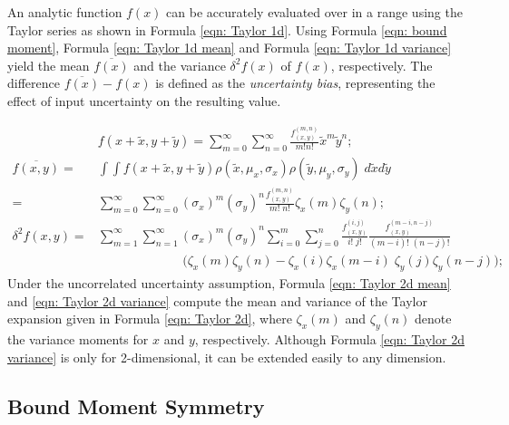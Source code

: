 \documentclass[twoside]{article}
\numberwithin{equation}{section}
\newcommand{\largespace}{\;\;\;\;\;\;\;\;\;\;\;\;}
\begin{document}
An analytic function $f(x)$ can be accurately evaluated over in a range using the Taylor series as shown in Formula \eqref{eqn: Taylor 1d}.
Using Formula \eqref{eqn: bound moment}, Formula \eqref{eqn: Taylor 1d mean} and Formula \eqref{eqn: Taylor 1d variance} yield the mean $\overline{f(x)}$ and the variance $\delta^2 f(x)$ of $f(x)$, respectively.
The difference $\overline{f(x)} - f(x)$ is defined as the \emph{uncertainty bias}, representing the effect of input uncertainty on the resulting value.

\begin{align}
\label{eqn: Taylor 2d}
&f(x + \tilde{x}, y + \tilde{y}) = \sum_{m=0}^{\infty} \sum_{n=0}^{\infty} \frac{f^{(m,n)}_{(x,y)}}{m! n!} \tilde{x}^m \tilde{y}^n; \\
\label{eqn: Taylor 2d mean}
\overline{f(x,y)} =& \int \int f(x + \tilde{x}, y + \tilde{y}) \rho(\tilde{x}, \mu_x, \sigma_x) \rho(\tilde{y}, \mu_y, \sigma_y)\; d \tilde{x} d \tilde{y} \\
=& \sum_{m=0}^{\infty} \sum_{n=0}^{\infty} (\sigma_x)^m (\sigma_y)^n \frac{f^{(m,n)}_{(x,y)}}{m!\;n!} \zeta_x(m) \zeta_y(n); \nonumber \\
\label{eqn: Taylor 2d variance}
\delta^2 f(x, y) =& \sum_{m=1}^{\infty} \sum_{n=1}^{\infty} (\sigma_x)^m (\sigma_y)^n \sum_{i=0}^{m} \sum_{j=0}^{n} 
		\frac{f^{(i,j)}_{(x,y)}}{i!\;j!}\frac{f^{(m-i, n-j)}_{(x,y)}}{(m-i)!\;(n-j)!} \nonumber \\
	&\largespace\largespace \big( \zeta_x(m) \zeta_y(n) - \zeta_x(i)\zeta_x(m-i)\; \zeta_y(j)\zeta_y(n-j) \big);
\end{align}
Under the uncorrelated uncertainty assumption, Formula \eqref{eqn: Taylor 2d mean} and \eqref{eqn: Taylor 2d variance} compute the mean and variance of the Taylor expansion given in Formula \eqref{eqn: Taylor 2d}, where $\zeta_x(m)$ and $\zeta_y(n)$ denote the variance moments for $x$ and $y$, respectively.
Although Formula \eqref{eqn: Taylor 2d variance} is only for 2-dimensional, it can be extended easily to any dimension.


\subsection{Bound Moment Symmetry}
\end{document}
